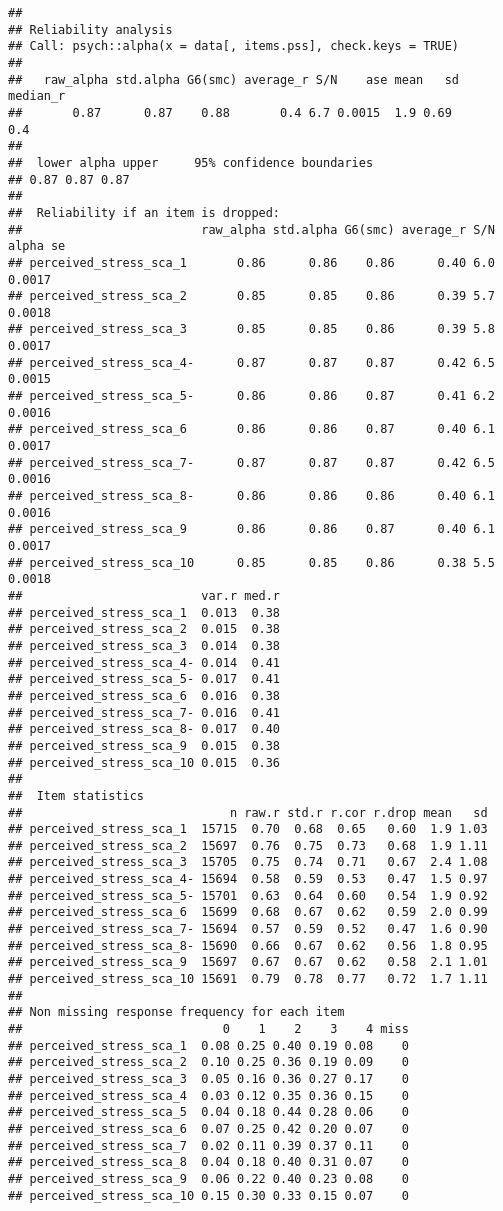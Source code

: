 \documentclass[
]{article}
\begin{document}
\begin{verbatim}
## 
## Reliability analysis   
## Call: psych::alpha(x = data[, items.pss], check.keys = TRUE)
## 
##   raw_alpha std.alpha G6(smc) average_r S/N    ase mean   sd median_r
##       0.87      0.87    0.88       0.4 6.7 0.0015  1.9 0.69      0.4
## 
##  lower alpha upper     95% confidence boundaries
## 0.87 0.87 0.87 
## 
##  Reliability if an item is dropped:
##                         raw_alpha std.alpha G6(smc) average_r S/N alpha se
## perceived_stress_sca_1       0.86      0.86    0.86      0.40 6.0   0.0017
## perceived_stress_sca_2       0.85      0.85    0.86      0.39 5.7   0.0018
## perceived_stress_sca_3       0.85      0.85    0.86      0.39 5.8   0.0017
## perceived_stress_sca_4-      0.87      0.87    0.87      0.42 6.5   0.0015
## perceived_stress_sca_5-      0.86      0.86    0.87      0.41 6.2   0.0016
## perceived_stress_sca_6       0.86      0.86    0.87      0.40 6.1   0.0017
## perceived_stress_sca_7-      0.87      0.87    0.87      0.42 6.5   0.0016
## perceived_stress_sca_8-      0.86      0.86    0.86      0.40 6.1   0.0016
## perceived_stress_sca_9       0.86      0.86    0.87      0.40 6.1   0.0017
## perceived_stress_sca_10      0.85      0.85    0.86      0.38 5.5   0.0018
##                         var.r med.r
## perceived_stress_sca_1  0.013  0.38
## perceived_stress_sca_2  0.015  0.38
## perceived_stress_sca_3  0.014  0.38
## perceived_stress_sca_4- 0.014  0.41
## perceived_stress_sca_5- 0.017  0.41
## perceived_stress_sca_6  0.016  0.38
## perceived_stress_sca_7- 0.016  0.41
## perceived_stress_sca_8- 0.017  0.40
## perceived_stress_sca_9  0.015  0.38
## perceived_stress_sca_10 0.015  0.36
## 
##  Item statistics 
##                             n raw.r std.r r.cor r.drop mean   sd
## perceived_stress_sca_1  15715  0.70  0.68  0.65   0.60  1.9 1.03
## perceived_stress_sca_2  15697  0.76  0.75  0.73   0.68  1.9 1.11
## perceived_stress_sca_3  15705  0.75  0.74  0.71   0.67  2.4 1.08
## perceived_stress_sca_4- 15694  0.58  0.59  0.53   0.47  1.5 0.97
## perceived_stress_sca_5- 15701  0.63  0.64  0.60   0.54  1.9 0.92
## perceived_stress_sca_6  15699  0.68  0.67  0.62   0.59  2.0 0.99
## perceived_stress_sca_7- 15694  0.57  0.59  0.52   0.47  1.6 0.90
## perceived_stress_sca_8- 15690  0.66  0.67  0.62   0.56  1.8 0.95
## perceived_stress_sca_9  15697  0.67  0.67  0.62   0.58  2.1 1.01
## perceived_stress_sca_10 15691  0.79  0.78  0.77   0.72  1.7 1.11
## 
## Non missing response frequency for each item
##                            0    1    2    3    4 miss
## perceived_stress_sca_1  0.08 0.25 0.40 0.19 0.08    0
## perceived_stress_sca_2  0.10 0.25 0.36 0.19 0.09    0
## perceived_stress_sca_3  0.05 0.16 0.36 0.27 0.17    0
## perceived_stress_sca_4  0.03 0.12 0.35 0.36 0.15    0
## perceived_stress_sca_5  0.04 0.18 0.44 0.28 0.06    0
## perceived_stress_sca_6  0.07 0.25 0.42 0.20 0.07    0
## perceived_stress_sca_7  0.02 0.11 0.39 0.37 0.11    0
## perceived_stress_sca_8  0.04 0.18 0.40 0.31 0.07    0
## perceived_stress_sca_9  0.06 0.22 0.40 0.23 0.08    0
## perceived_stress_sca_10 0.15 0.30 0.33 0.15 0.07    0
\end{verbatim}
\end{document}
